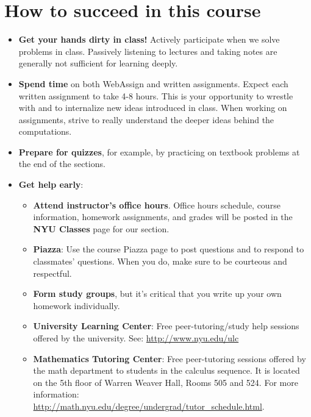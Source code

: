 \documentclass[10pt]{article}
\theoremstyle{definition}
\begin{document}
\section*{How to succeed in this course}

\begin{itemize}
\item \textbf{Get your hands dirty in class!}  Actively participate when we solve problems in class.  Passively listening to lectures and taking notes are generally not sufficient for learning deeply.

\item \textbf{Spend time} on both WebAssign and written assignments.  Expect each written assignment to take 4-8 hours.  This is your opportunity to wrestle with and to internalize new ideas introduced in class.  When working on assignments, strive to really understand the deeper ideas behind the computations.

\item \textbf{Prepare for quizzes}, for example, by practicing on textbook problems at the end of the sections.

\item \textbf{Get help early}:
\begin{itemize}
\item \textbf{Attend instructor's office hours}.  Office hours schedule, course information, homework assignments, and grades will be posted in  the \textbf{NYU Classes} page for our section.
\item \textbf{Piazza}: Use the course Piazza page to post questions and to respond to classmates' questions.  When you do, make sure to be courteous and respectful.  %
\item \textbf{Form study groups}, but it's critical that you write up your own homework individually.
\item \textbf{University Learning Center}: Free peer-tutoring/study help sessions offered by the university.  See: \url{http://www.nyu.edu/ulc}
\item \textbf{Mathematics Tutoring Center}: Free peer-tutoring sessions offered by the math department to students in the calculus sequence.  It is located on the 5th floor of Warren Weaver Hall, Rooms 505 and 524.  For more information: {\footnotesize \url{http://math.nyu.edu/degree/undergrad/tutor_schedule.html}}.

\end{itemize}
\end{itemize}
\end{document}
